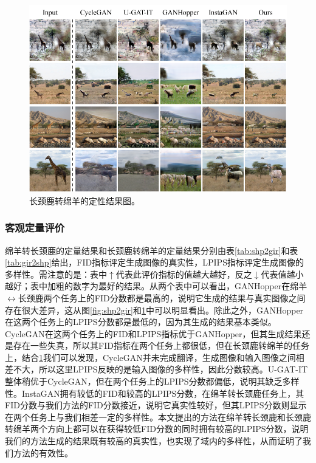 \begin{figure}[ht]
    \centering
  \includegraphics[width=\textwidth]{figs/gir2shp.pdf}
  \caption{长颈鹿转绵羊的定性结果图。}
  \label{fig:gir2shp}
\end{figure}

\subsubsection{客观定量评价}

绵羊转长颈鹿的定量结果和长颈鹿转绵羊的定量结果分别由表\ref{tab:shp2gir}和表\ref{tab:gir2shp}给出，FID指标评定生成图像的真实性，LPIPS指标评定生成图像的多样性。需注意的是：表中$\uparrow$代表此评价指标的值越大越好，反之$\downarrow$代表值越小越好；表中加粗的数字为最好的结果。从两个表中可以看出，GANHopper在绵羊$\leftrightarrow$长颈鹿两个任务上的FID分数都是最高的，说明它生成的结果与真实图像之间存在很大差异，这从图\ref{fig:shp2gir}和\ref{fig:gir2shp}中可以明显看出。除此之外，GANHopper在这两个任务上的LPIPS分数都是最低的，因为其生成的结果基本类似。CycleGAN在这两个任务上的FID和LPIPS指标优于GANHopper，但其生成结果还是存在一些失真，所以其FID指标在两个任务上都很低，但在长颈鹿转绵羊的任务上，结合\ref{fig:gir2shp}我们可以发现，CycleGAN并未完成翻译，生成图像和输入图像之间相差不大，所以这里LPIPS反映的是输入图像的多样性，因此分数较高。U-GAT-IT整体稍优于CycleGAN，但在两个任务上的LPIPS分数都偏低，说明其缺乏多样性。InstaGAN拥有较低的FID和较高的LPIPS分数，在绵羊转长颈鹿任务上，其FID分数与我们方法的FID分数接近，说明它真实性较好，但其LPIPS分数则显示在两个任务上与我们相差一定的多样性。本文提出的方法在绵羊转长颈鹿和长颈鹿转绵羊两个方向上都可以在获得较低FID分数的同时拥有较高的LPIPS分数，说明我们的方法生成的结果既有较高的真实性，也实现了域内的多样性，从而证明了我们方法的有效性。

